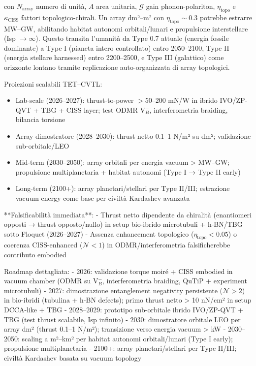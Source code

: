 \documentclass[11pt,a4paper]{article}
\theoremstyle{plain}
\theoremstyle{definition}
\begin{document}
con $N_{\mathrm{array}}$ numero di unità, $A$ area unitaria, $\mathcal{G}$ gain phonon-polariton, $\eta_{\mathrm{topo}}$ e $\kappa_{\mathrm{CISS}}$ fattori topologico-chirali. Un array dm²–m² con $\eta_{\mathrm{topo}} \sim 0.3$ potrebbe estrarre MW–GW, abilitando habitat autonomi orbitali/lunari e propulsione interstellare (Isp $\to \infty$). Questo transita l'umanità da Type 0.7 attuale (energia fossile dominante) a Type I (pianeta intero controllato) entro 2050–2100, Type II (energia stellare harnessed) entro 2200–2500, e Type III (galattico) come orizzonte lontano tramite replicazione auto-organizzata di array topologici.

\vspace{0.3cm}

Proiezioni scalabili TET–CVTL:
\begin{itemize}
    \item Lab-scale (2026–2027): thrust-to-power $>50$--$200$ mN/W in ibrido IVO/ZP-QVT + TBG + CISS layer; test ODMR V$_B^-$, interferometria braiding, bilancia torsione
    \item Array dimostratore (2028–2030): thrust netto 0.1–1 N/m² su dm²; validazione sub-orbitale/LEO
    \item Mid-term (2030–2050): array orbitali per energia vacuum > MW–GW; propulsione multiplanetaria + habitat autonomi (Type I → Type II early)
    \item Long-term (2100+): array planetari/stellari per Type II/III; estrazione vacuum energy come base per civiltà Kardashev avanzata
\end{itemize}

**Falsificabilità immediata**:
- Thrust netto dipendente da chiralità (enantiomeri opposti → thrust opposto/nullo) in setup bio-ibrido microtubuli + h-BN/TBG sotto Floquet (2026–2027)
- Assenza enhancement topologico ($\eta_{\mathrm{topo}} < 0.05$) o coerenza CISS-enhanced ($\mathcal{N} < 1$) in ODMR/interferometria falsificherebbe contributo embodied

\vspace{0.3cm}

Roadmap dettagliata:
- 2026: validazione torque moiré + CISS embodied in vacuum chamber (ODMR su V$_B^-$, interferometria braiding, QuTiP + experiment microtubuli)
- 2027: dimostrazione entanglement negativity persistente ($\mathcal{N} > 2$) in bio-ibridi (tubulina + h-BN defects); primo thrust netto > 10 nN/cm² in setup DCCA-like + TBG
- 2028–2029: prototipo sub-orbitale ibrido IVO/ZP-QVT + TBG (test thrust scalabile, Isp infinito)
- 2030: dimostratore orbitale LEO per array dm² (thrust 0.1–1 N/m²); transizione verso energia vacuum > kW
- 2030–2050: scaling a m²–km² per habitat autonomi orbitali/lunari (Type I early); propulsione multiplanetaria
- 2100+: array planetari/stellari per Type II/III; civiltà Kardashev basata su vacuum topology
\end{document}
